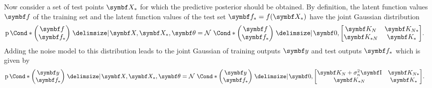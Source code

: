 Now consider a set of test points $\mat{X_\ast}$ for which the predictive posterior should be obtained.
By definition, the latent function values $\mat{f}$ of the training set and the latent function values of the test set $\mat{f_\ast} = f(\mat{X_\ast})$ have the joint Gaussian distribution
\begin{align}
    \Prob*{\begin{pmatrix}
            \mat{f} \\
            \mat{f_\ast}
        \end{pmatrix} \given \mat{X}, \mat{X_\ast}, \mat{\theta}} & = \Gaussian*{\begin{pmatrix}
            \mat{f} \\
            \mat{f_\ast}
        \end{pmatrix} \given \mat{0}, \begin{bmatrix}
            \mat{K_N}        & \mat{K_{N\ast}} \\
            \mat{K_{\ast N}} & \mat{K_{\ast}}
        \end{bmatrix}}.
\end{align}
Adding the noise model to this distribution leads to the joint Gaussian of training outputs $\mat{y}$ and test outputs $\mat{f_\ast}$ which is given by
\begin{align}
    \Prob*{\begin{pmatrix}
            \mat{y} \\
            \mat{f_\ast}
        \end{pmatrix} \given \mat{X}, \mat{X_\ast}, \mat{\theta}} & = \Gaussian*{\begin{pmatrix}
            \mat{y} \\
            \mat{f_\ast}
        \end{pmatrix} \given \mat{0}, \begin{bmatrix}
            \mat{K_N} + \sigma_n^2 \Eye & \mat{K_{N\ast}} \\
            \mat{K_{\ast N}}            & \mat{K_{\ast}}
        \end{bmatrix}}.
\end{align}

